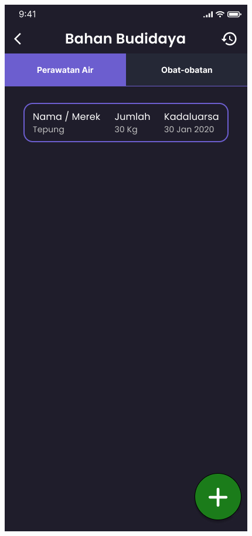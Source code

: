 \begin{spacing}{1.5}
	\begin{figure}[H]
			\includegraphics[width=\linewidth]{gambar/sprint1/mockup_detail_materials.png}

\end{figure}
\end{spacing}
